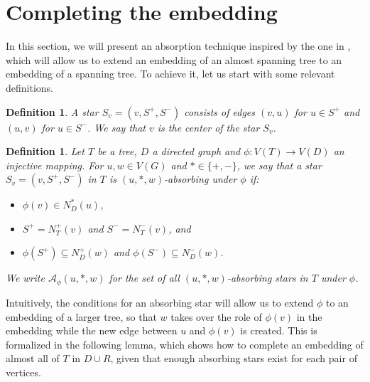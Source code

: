 \documentclass[10pt, a4paper]{article}
\newtheorem{definition}[theorem]{Definition}
\theoremstyle{remark}
\begin{document}
\section{Completing the embedding}\label{section:absorption}
In this section, we will present an absorption technique inspired by the one in \cite{bottcher2020embedding,undirected_spanning_universality}, which will allow us to extend an embedding of an almost spanning tree to an embedding of a spanning tree.
To achieve it, let us start with some relevant definitions.
\begin{definition}
    A \emph{star} $S_v = (v, S^+, S^-)$ consists of edges $(v, u)$ for $u \in S^+$ and $(u,v)$ for $u \in S^-$.
    We say that $v$ is the \emph{center} of the star $S_v$.
\end{definition}

\begin{definition}
    Let $T$ be a tree, $D$ a directed graph and $\phi: V(T) \to V(D)$ an injective mapping.
    For $u, w \in V(G)$ and $* \in \{+, -\}$, we say that a star  $S_v = (v, S^+, S^-)$ in $T$ is $(u,*,w)$-absorbing under $\phi$ if:
    \begin{itemize}
        \item $\phi(v) \in N_D^*(u)$,
        \item $S^+ = N_T^+(v)$ and $S^- = N_T^-(v)$, \emph{and}
        \item $\phi(S^+) \subseteq N_D^+(w)$ and $\phi(S^-) \subseteq N_D^-(w)$.
    \end{itemize}
    We write $\mathcal{A}_\phi(u,*,w)$ for the set of all $(u,*,w)$-absorbing stars in $T$ under $\phi$.
\end{definition}
Intuitively, the conditions for an absorbing star will allow us to extend $\phi$ to an embedding of a larger tree,
so that $w$ takes over the role of $\phi(v)$ in the embedding while the new edge between $u$ and $\phi(v)$ is created.
This is formalized in the following lemma, which shows how to complete an embedding of almost all of $T$ in $D \cup R$,
given that enough absorbing stars exist for each pair of vertices. 
\end{document}
